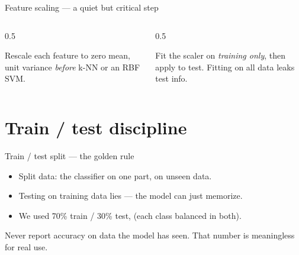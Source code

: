 \documentclass[10pt,aspectratio=169]{beamer}
\begin{document}
\begin{frame}{Feature scaling — a quiet but critical step}
  \begin{columns}[T]
    \begin{column}{0.5\textwidth}
      \begin{goodbox}[Standardize]
        Rescale each feature to zero mean, unit variance \emph{before} k-NN or an RBF SVM.
      \end{goodbox}
    \end{column}
    \begin{column}{0.5\textwidth}
      \begin{badbox}[Leakage]
        Fit the scaler on \emph{training only}, then apply to test. Fitting on all data leaks test info.
      \end{badbox}
    \end{column}
  \end{columns}
\end{frame}

\section{Train / test discipline}

\begin{frame}{Train / test split — the golden rule}
  \begin{itemize}
    \item Split data:  the classifier on one part,  on unseen data.
    \item Testing on training data lies — the model can just memorize.
    \item We used 70\% train / 30\% test,  (each class balanced in both).
  \end{itemize}
  \begin{badbox}
    Never report accuracy on data the model has seen. That number is meaningless for real use.
  \end{badbox}
\end{frame}
\end{document}
